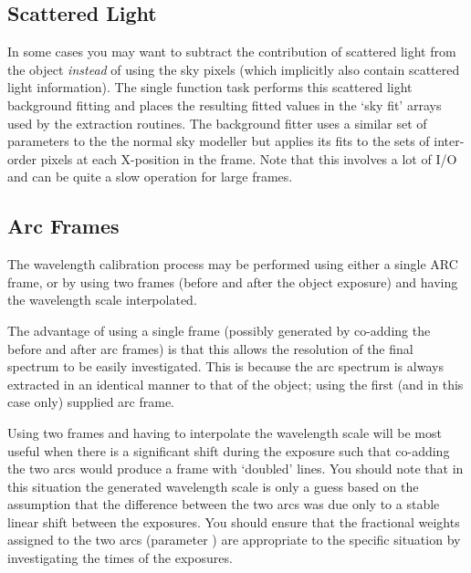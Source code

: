 \subsection{Scattered Light}

In some cases you may want to subtract the contribution of
scattered light from the object {\em instead} of using the sky pixels
(which implicitly also contain scattered light information). The
single function task 
performs this scattered light
background fitting and places the resulting fitted values in the `sky
fit' arrays used by the extraction routines. The background fitter
uses a similar set of parameters to the the normal sky modeller but
applies its fits to the sets of inter-order pixels at each X-position
in the frame. Note that this involves a lot of I/O and can be quite a
slow operation for large frames.


\subsection{Arc Frames}

The wavelength calibration process may be performed using either a
single ARC frame,  or by using two frames (before and after the
object exposure) and having the wavelength scale interpolated.

The advantage of using a single frame (possibly generated by
co-adding the before and after arc frames) is that this allows the
resolution of the final spectrum to be easily investigated. This is
because the arc spectrum is always extracted in an identical manner
to that of the object; using the first (and in this case only)
supplied arc frame.

Using two frames and having to interpolate the wavelength scale will
be most useful when there is a significant shift during the exposure
such that co-adding the two arcs would produce a frame with `doubled'
lines.
You should note that in this situation the generated
wavelength scale is only a guess based on the assumption that the
difference between the two arcs was due only to a stable linear
shift between the exposures.
You should ensure that the fractional weights assigned to the two arcs
(parameter 
) are appropriate to the specific situation
by investigating the times of the exposures.

